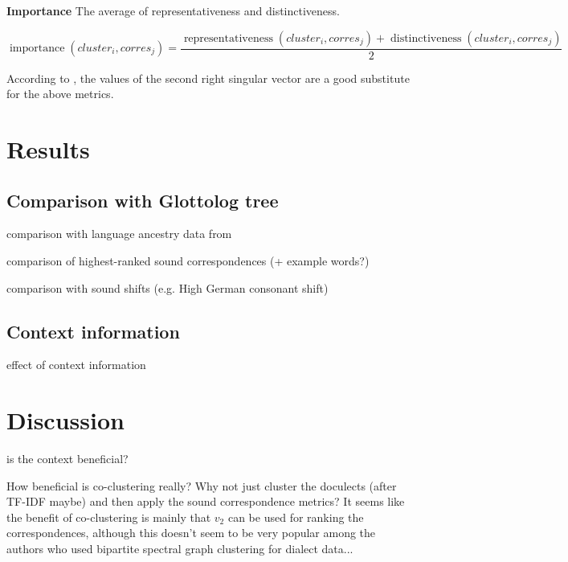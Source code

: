 \documentclass{article}
\begin{document}
\textbf{Importance}
The average of representativeness and distinctiveness.

\begin{equation*}
\operatorname{importance}(cluster_i, corres_j) = 
\frac{\operatorname{representativeness}(cluster_i, corres_j) + \operatorname{distinctiveness}(cluster_i, corres_j)}
{2}
\end{equation*}


According to \cite{wieling2010hierarchical}, the values of the second right singular vector are a good substitute for the above metrics.

\section{Results}

\subsection{Comparison with Glottolog tree}
comparison with language ancestry data from \cite{hammarstrom2018glottolog}

comparison of highest-ranked sound correspondences
(+ example words?)

comparison with sound shifts (e.g. High German consonant shift)

\subsection{Context information}
effect of context information

\section{Discussion}


is the context beneficial?

How beneficial is co-clustering really? Why not just cluster the doculects (after TF-IDF maybe) and then apply the sound correspondence metrics? It seems like the benefit of co-clustering is mainly that $v_2$ can be used for ranking the correspondences, although this doesn't seem to be very popular among the authors who used bipartite spectral graph clustering for dialect data...
\end{document}

